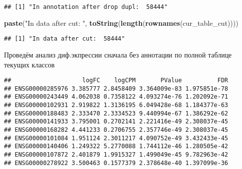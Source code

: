 \documentclass[
]{article}
\newenvironment{Shaded}{\begin{snugshade}}{\end{snugshade}}
\newcommand{\CommentTok}[1]{\textcolor[rgb]{0.56,0.35,0.01}{\textit{#1}}}
\newcommand{\DataTypeTok}[1]{\textcolor[rgb]{0.13,0.29,0.53}{#1}}
\newcommand{\KeywordTok}[1]{\textcolor[rgb]{0.13,0.29,0.53}{\textbf{#1}}}
\newcommand{\NormalTok}[1]{#1}
\newcommand{\OperatorTok}[1]{\textcolor[rgb]{0.81,0.36,0.00}{\textbf{#1}}}
\newcommand{\StringTok}[1]{\textcolor[rgb]{0.31,0.60,0.02}{#1}}
\begin{document}
\begin{verbatim}
## [1] "In annotation after drop dupl:  58444"
\end{verbatim}

\begin{Shaded}
\begin{Highlighting}[]
\KeywordTok{paste}\NormalTok{(}\StringTok{"In data after cut: "}\NormalTok{, }\KeywordTok{toString}\NormalTok{(}\KeywordTok{length}\NormalTok{(}\KeywordTok{rownames}\NormalTok{(cur_table_cut))))}
\end{Highlighting}
\end{Shaded}

\begin{verbatim}
## [1] "In data after cut:  58444"
\end{verbatim}

Проведём анализ диф.экпрессии сначала без аннотации по полной таблице
текущих классов

\begin{Shaded}
\end{Shaded}

\begin{verbatim}
##                    logFC    logCPM       PValue          FDR
## ENSG00000285976 3.385777 2.8458409 3.364009e-83 1.975851e-78
## ENSG00000243449 4.062038 0.7358122 4.093274e-76 1.202092e-71
## ENSG00000102931 2.919822 1.3136195 6.049428e-68 1.184377e-63
## ENSG00000188483 2.333470 2.3334523 9.440994e-67 1.386292e-62
## ENSG00000141933 3.795001 0.2702141 2.221416e-49 2.308037e-45
## ENSG00000168282 4.441233 0.2706755 2.357746e-49 2.308037e-45
## ENSG00000101084 1.951124 2.3011217 4.090752e-49 3.432433e-45
## ENSG00000140406 1.249322 5.2770088 1.744112e-46 1.280505e-42
## ENSG00000107872 2.401879 1.9915327 1.499049e-45 9.782963e-42
## ENSG00000278922 3.500463 0.1577379 2.378648e-40 1.397099e-36
\end{verbatim}
\end{document}
